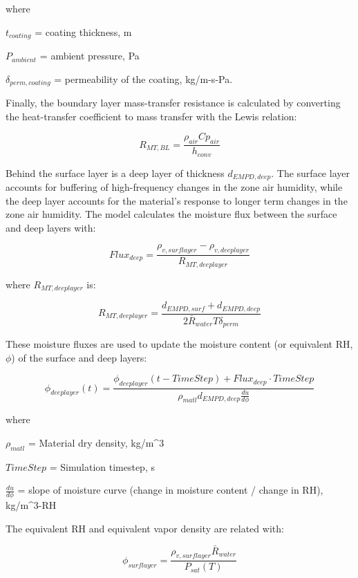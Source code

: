 where

$t_{coating}$ = coating thickness, m

$P_{ambient}$ = ambient pressure, Pa

$\delta_{perm,coating}$ = permeability of the coating, kg/m-s-Pa.

Finally, the boundary layer mass-transfer resistance is calculated by converting the heat-transfer coefficient to mass transfer with the Lewis relation:

\begin{equation}
R_{MT,BL} = \frac{\rho_{air} Cp_{air}}{h_{conv}}
\end{equation}

Behind the surface layer is a deep layer of thickness $d_{EMPD,deep}$. The surface layer accounts for buffering of high-frequency changes in the zone air humidity, while the deep layer accounts for the material's response to longer term changes in the zone air humidity. The model calculates the moisture flux between the surface and deep layers with:

\begin{equation}
Flux_{deep} = \frac {\rho_{v,surflayer} - \rho_{v,deeplayer}} {R_{MT,deeplayer}}
\end{equation}

where $R_{MT,deeplayer}$ is:

\begin{equation}
R_{MT,deeplayer} = \frac {d_{EMPD,surf} + d_{EMPD,deep}} {2 \bar R_{water} T \delta_{perm} }
\end{equation}

These moisture fluxes are used to update the moisture content (or equivalent RH, $\phi$) of the surface and deep layers:

\begin{equation}
\phi_{deeplayer}(t) = \frac {\phi_{deeplayer}(t-TimeStep) + Flux_{deep} \cdot TimeStep} {\rho_{matl} d_{EMPD,deep} \frac {du}{d\phi}}
\end{equation}

where

$\rho_{matl}$ = Material dry density, kg/m^3

$TimeStep$ = Simulation timestep, s

$\frac {du}{d\phi}$ = slope of moisture curve (change in moisture content / change in RH), kg/m^3-RH

The equivalent RH and equivalent vapor density are related with:

\begin{equation}
\phi_{surflayer} = \frac {\rho_{v,surflayer} \bar R_{water}} {P_{sat}(T)}
\end{equation}

